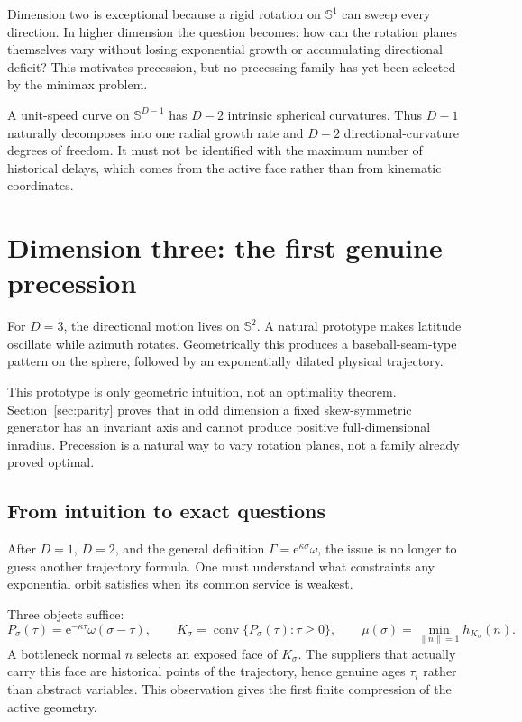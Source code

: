 \documentclass[10pt,a4paper]{article}
\newcommand{\Sph}{\mathbb{S}}
\newcommand{\conv}{\operatorname{conv}}
\newcommand{\e}{\mathrm{e}}
\theoremstyle{plain}
\theoremstyle{definition}
\theoremstyle{remark}
\begin{document}
Dimension two is exceptional because a rigid rotation on $\Sph^1$ can sweep every direction. In higher dimension the question becomes: how can the rotation planes themselves vary without losing exponential growth or accumulating directional deficit? This motivates precession, but no precessing family has yet been selected by the minimax problem.

A unit-speed curve on $\Sph^{D-1}$ has $D-2$ intrinsic spherical curvatures. Thus $D-1$ naturally decomposes into one radial growth rate and $D-2$ directional-curvature degrees of freedom. It must not be identified with the maximum number of historical delays, which comes from the active face rather than from kinematic coordinates.

\section{Dimension three: the first genuine precession}

For $D=3$, the directional motion lives on $\Sph^2$. A natural prototype makes latitude oscillate while azimuth rotates. Geometrically this produces a baseball-seam-type pattern on the sphere, followed by an exponentially dilated physical trajectory.

This prototype is only geometric intuition, not an optimality theorem. Section~\ref{sec:parity} proves that in odd dimension a fixed skew-symmetric generator has an invariant axis and cannot produce positive full-dimensional inradius. Precession is a natural way to vary rotation planes, not a family already proved optimal.

\subsection{From intuition to exact questions}

After $D=1$, $D=2$, and the general definition $\Gamma=\e^{\kappa\sigma}\omega$, the issue is no longer to guess another trajectory formula. One must understand what constraints any exponential orbit satisfies when its common service is weakest.

Three objects suffice:
\[
  P_\sigma(\tau)=\e^{-\kappa\tau}\omega(\sigma-\tau),
  \qquad
  K_\sigma=\conv\{P_\sigma(\tau):\tau\ge0\},
  \qquad
  \mu(\sigma)=\min_{\|n\|=1}h_{K_\sigma}(n).
\]
A bottleneck normal $n$ selects an exposed face of $K_\sigma$. The suppliers that actually carry this face are historical points of the trajectory, hence genuine ages $\tau_i$ rather than abstract variables. This observation gives the first finite compression of the active geometry.
\end{document}
